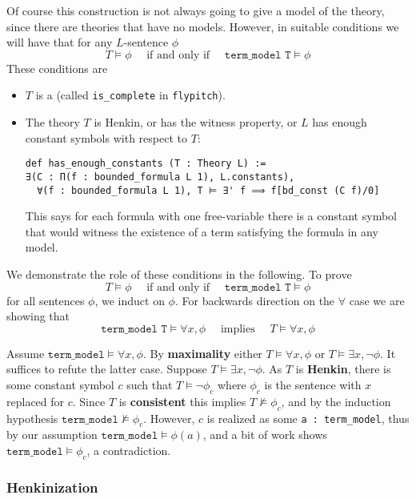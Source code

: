 Of course this construction is not always going to give a model of the
theory, since there are theories that have no models.
However, in suitable conditions we will have that for any $L$-sentence $\phi$
\[
  T \vDash \phi \quad \text{ if and only if } \quad
  \texttt{term\_model T} \vDash \phi
\]
These conditions are
\begin{itemize}
  \item $T$ is a 
        (called \texttt{is\_complete} in \texttt{flypitch}).
  \item The theory $T$ is Henkin, or has the witness property,
        or $L$ has enough constant symbols with respect to $T$:
\begin{lstlisting}
def has_enough_constants (T : Theory L) :=
∃(C : Π(f : bounded_formula L 1), L.constants),
  ∀(f : bounded_formula L 1), T ⊨ ∃' f ⟹ f[bd_const (C f)/0] \end{lstlisting}
        This says for each formula with one free-variable
        there is a constant symbol that would witness the
        existence of a term satisfying the formula in any model.
\end{itemize}

We demonstrate the role of these conditions in the following.
To prove
\[ T \vDash \phi \quad \text{ if and only if } \quad
  \texttt{term\_model T} \vDash \phi \]
for all sentences $\phi$, we induct on $\phi$.
For backwards direction on the $\forall$ case
we are showing that
\[ \texttt{term\_model T} \vDash \forall x, \phi \quad \text{ implies }
  \quad T \vDash \forall x, \phi \]

Assume $\texttt{term\_model} \vDash \forall x, \phi$.
By \textbf{maximality} either $T \vDash \forall x, \phi$ or
$T \vDash \exists x, \neg \phi$.
It suffices to refute the latter case.
Suppose $T \vDash \exists x, \neg \phi$.
As $T$ is \textbf{Henkin},
there is some constant symbol $c$ such that $T \vDash \neg \phi_{c}$
where $\phi_{c}$ is the sentence with $x$ replaced for $c$.
Since $T$ is \textbf{consistent} this implies $T \nvDash \phi_{c}$,
and by the induction hypothesis $\texttt{term\_model} \nvDash \phi_{c}$.
However, $c$ is realized as some \texttt{a : term\_model},
thus by our assumption $\texttt{term\_model} \vDash \phi(a)$,
and a bit of work shows $\texttt{term\_model} \vDash \phi_{c}$,
a contradiction.

\subsubsection{Henkinization}

